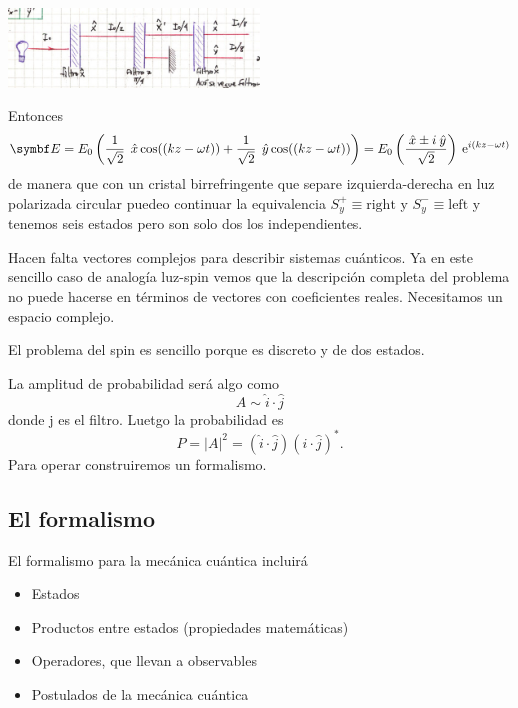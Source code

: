 \documentclass[10pt,oneside]{CBFT_book}
\begin{document}
\includegraphics[width=0.5\textwidth]{images/fig_ft2_polarizacion_3.jpg}

Entonces
\[
	\vb E = E_0 \left( 
	\frac{1}{\sqrt{2}} \: \xver \cos( (kz-\omega t) ) + \frac{1}{\sqrt{2}} \: \yver \cos( (kz-\omega t) )
	\right) =
	E_0 \left( \frac{ \xver \pm i \yver }{\sqrt{2}} \right) \euler^{i(kz-\omega t)}
\]
de manera que con un cristal birrefringente que separe izquierda-derecha en luz polarizada
circular puedeo continuar la equivalencia
$S_y^+ \equiv \text{right}$ y $S_y^- \equiv \text{left}$ y tenemos seis estados pero son
solo dos los independientes.

Hacen falta vectores complejos para describir sistemas cuánticos. Ya en este sencillo caso
de analogía luz-spin vemos que la descripción completa del problema no puede hacerse en
términos de vectores con coeficientes reales.
Necesitamos un espacio complejo.

El problema del spin es sencillo porque es discreto y de dos estados.

La amplitud de probabilidad será algo como
\[
	A \sim \hat{i} \cdot \hat{j}
\]
donde j es el filtro. Luetgo la probabilidad es
\[
	P = |A|^2 = (\hat{i} \cdot \hat{j})(\hat{i} \cdot \hat{j})^*.
\]
Para operar construiremos un formalismo.

\subsection{El formalismo}

El formalismo para la mecánica cuántica incluirá
\begin{itemize}
	\item Estados
	\item Productos entre estados (propiedades matemáticas)
	\item Operadores, que llevan a observables
	\item Postulados de la mecánica cuántica
\end{itemize}
\end{document}
